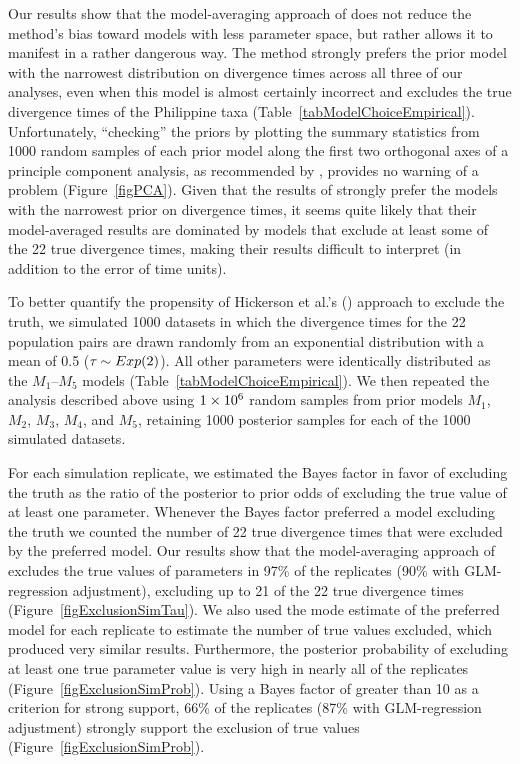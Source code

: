 \documentclass[letterpaper,12pt]{article}
\begin{document}
\begin{linenumbers}
Our results show that the model-averaging approach of \citet{Hickerson2013}
does not reduce the method's bias toward models with less parameter space,
but rather allows it to manifest in a rather dangerous way.
The method strongly prefers the prior model with the narrowest distribution on
divergence times across all three of our analyses, even when this model is
almost certainly incorrect and excludes the true divergence times of the
Philippine taxa (Table~\ref{tabModelChoiceEmpirical}).
Unfortunately, ``checking'' the priors by plotting the summary statistics from
1000 random samples of each prior model along the first two orthogonal axes of
a principle component analysis, as recommended by \citet{Hickerson2013},
provides no warning of a problem (Figure~\ref{figPCA}).
Given that the results of \citet{Hickerson2013} strongly prefer the models with
the narrowest prior on divergence times, it seems quite likely that their
model-averaged results are dominated by models that exclude at least some of
the 22 true divergence times, making their results difficult to interpret
(in addition to the error of time units).

To better quantify the propensity of Hickerson et al.'s
(\citeyear{Hickerson2013}) approach to exclude the truth, we simulated 1000
datasets in which the divergence times for the 22 population pairs are drawn
randomly from an exponential distribution with a mean of 0.5 ($\tau_{} \sim
Exp(2)$).
All other parameters were identically distributed as the $M_1$--$M_5$ models
(Table~\ref{tabModelChoiceEmpirical}).
We then repeated the analysis described above using $1\times 10^{6}$ random samples from
prior models $M_1$, $M_2$, $M_3$, $M_4$, and $M_5$, retaining 1000 posterior
samples for each of the 1000 simulated datasets.

For each simulation replicate, we estimated the Bayes factor in favor
of excluding the truth as the ratio of the posterior to prior odds of
excluding the true value of at least one parameter.
Whenever the Bayes factor preferred a model excluding the truth we counted
the number of 22 true divergence times that were excluded by the preferred
model.
Our results show that the model-averaging approach of \citet{Hickerson2013}
excludes the true values of parameters in 97\% of the replicates (90\% with
GLM-regression adjustment), excluding up to 21 of the 22 true divergence times
(Figure~\ref{figExclusionSimTau}).
We also used the mode estimate of the preferred model for each replicate to
estimate the number of true values excluded, which produced very similar
results.
Furthermore, the posterior probability of excluding at least one true parameter
value is very high in nearly all of the replicates
(Figure~\ref{figExclusionSimProb}).
Using a Bayes factor of greater than 10 as a criterion for strong support, 66\%
of the replicates (87\% with GLM-regression adjustment) strongly support the
exclusion of true values (Figure~\ref{figExclusionSimProb}).


\end{linenumbers}
\end{document}
